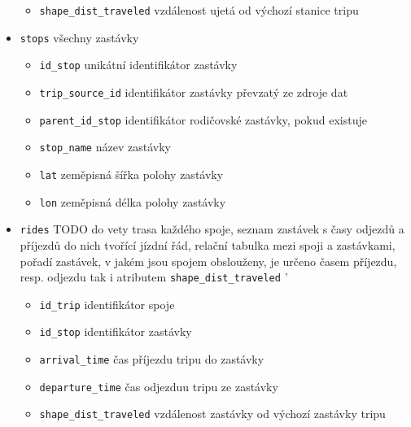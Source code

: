\begin{itemize}
\begin{itemize}
\item \verb-shape_dist_traveled- vzdálenost ujetá od výchozí stanice tripu


\end{itemize}


\item \verb-stops- všechny zastávky


\begin{itemize}
\item \verb-id_stop- unikátní identifikátor zastávky


\item \verb-trip_source_id- identifikátor zastávky převzatý ze zdroje dat


\item \verb-parent_id_stop- identifikátor rodičovské zastávky, pokud existuje


\item \verb-stop_name- název zastávky


\item \verb-lat- zeměpisná šířka polohy zastávky


\item \verb-lon- zeměpisná délka polohy zastávky


\end{itemize}


\item \verb-rides- TODO do vety trasa každého spoje, seznam zastávek s časy odjezdů a příjezdů do nich tvořící jízdní řád, relační tabulka mezi spoji a zastávkami, pořadí zastávek, v jakém jsou spojem obslouženy, je určeno časem příjezdu, resp. odjezdu tak i atributem \verb-shape_dist_traveled- \label{table:rides}'


\begin{itemize}
\item \verb-id_trip- identifikátor spoje


\item \verb-id_stop- identifikátor zastávky


\item \verb-arrival_time- čas příjezdu tripu do zastávky


\item \verb-departure_time- čas odjezduu tripu ze zastávky


\item \verb-shape_dist_traveled- vzdálenost zastávky od výchozí zastávky tripu


\end{itemize}


\end{itemize}


